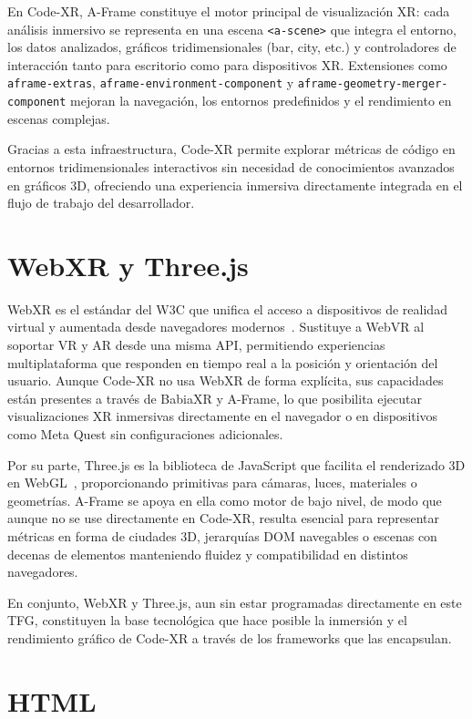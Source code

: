 \documentclass[a4paper, 12pt]{book}
\begin{document}
En Code-XR, A-Frame constituye el motor principal de visualización XR: cada análisis inmersivo se representa en una escena \texttt{<a-scene>} que integra el entorno, los datos analizados, gráficos tridimensionales (bar, city, etc.) y controladores de interacción tanto para escritorio como para dispositivos XR. Extensiones como \texttt{aframe-extras}, \texttt{aframe-environment-component} y \texttt{aframe-geometry-merger-component} mejoran la navegación, los entornos predefinidos y el rendimiento en escenas complejas.  

Gracias a esta infraestructura, Code-XR permite explorar métricas de código en entornos tridimensionales interactivos sin necesidad de conocimientos avanzados en gráficos 3D, ofreciendo una experiencia inmersiva directamente integrada en el flujo de trabajo del desarrollador.

\section{WebXR y Three.js}
\label{sec:webxr-threejs}

WebXR es el estándar del W3C que unifica el acceso a dispositivos de realidad virtual y aumentada desde navegadores modernos~\cite{webxr}. Sustituye a WebVR al soportar VR y AR desde una misma API, permitiendo experiencias multiplataforma que responden en tiempo real a la posición y orientación del usuario. Aunque Code-XR no usa WebXR de forma explícita, sus capacidades están presentes a través de BabiaXR y A-Frame, lo que posibilita ejecutar visualizaciones XR inmersivas directamente en el navegador o en dispositivos como Meta Quest sin configuraciones adicionales.  

Por su parte, Three.js es la biblioteca de JavaScript que facilita el renderizado 3D en WebGL~\cite{threejs}, proporcionando primitivas para cámaras, luces, materiales o geometrías. A-Frame se apoya en ella como motor de bajo nivel, de modo que aunque no se use directamente en Code-XR, resulta esencial para representar métricas en forma de ciudades 3D, jerarquías DOM navegables o escenas con decenas de elementos manteniendo fluidez y compatibilidad en distintos navegadores.  

En conjunto, WebXR y Three.js, aun sin estar programadas directamente en este TFG, constituyen la base tecnológica que hace posible la inmersión y el rendimiento gráfico de Code-XR a través de los frameworks que las encapsulan.


\section{HTML}
\label{sec:html}
\end{document}
